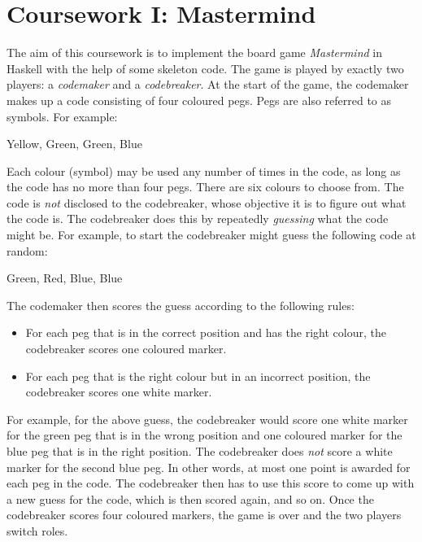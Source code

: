 
\newcommand{\deadlineOneTime}{noon}
\newcommand{\deadlineOneDate}{7 February 2019}
\newcommand{\submissionOneURL}{https://tabula.warwick.ac.uk/coursework/submission/a98ab001-55e8-4ab8-87d3-666b6333db42}



\cleardoublepage
\chapter{Coursework I: Mastermind}

The aim of this coursework is to implement the board game \emph{Mastermind} in Haskell with the help of some skeleton code. The game is played by exactly two players: a \emph{codemaker} and a \emph{codebreaker}. At the start of the game, the codemaker makes up a code consisting of four coloured pegs. Pegs are also referred to as symbols. For example:
\begin{center}
    Yellow, Green, Green, Blue
\end{center}
Each colour (symbol) may be used any number of times in the code, as long as the code has no more than four pegs. There are six colours to choose from. The code is \emph{not} disclosed to the codebreaker, whose objective it is to figure out what the code is. The codebreaker does this by repeatedly \emph{guessing} what the code might be. For example, to start the codebreaker might guess the following code at random:
\begin{center}
    Green, Red, Blue, Blue
\end{center}
The codemaker then scores the guess according to the following rules:
\begin{itemize}
    \item For each peg that is in the correct position and has the right colour, the codebreaker scores one coloured marker.
    \item For each peg that is the right colour but in an incorrect position, the codebreaker scores one white marker.
\end{itemize}
For example, for the above guess, the codebreaker would score one white marker for the green peg that is in the wrong position and one coloured marker for the blue peg that is in the right position. The codebreaker does \emph{not} score a white marker for the second blue peg. In other words, at most one point is awarded for each peg in the code. The codebreaker then has to use this score to come up with a new guess for the code, which is then scored again, and so on. Once the codebreaker scores four coloured markers, the game is over and the two players switch roles.

